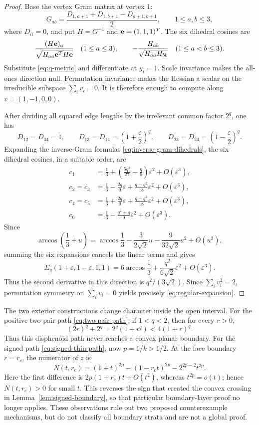 \documentclass[11pt,a4paper]{article}
\theoremstyle{definition}
\theoremstyle{remark}
\begin{document}
\begin{proof}
Base the vertex Gram matrix at vertex $1$:
\[
 G_{ab}=\frac{D_{1,a+1}+D_{1,b+1}-D_{a+1,b+1}}2,
 \qquad1\leq a,b\leq3,
\]
where $D_{ii}=0$, and put $H=G^{-1}$ and ${\bf e}=(1,1,1)^T$.  The six
dihedral cosines are
\begin{equation}\label{eq:inverse-gram-dihedrals}
 \frac{(H{\bf e})_a}{\sqrt{H_{aa}{\bf e}^TH{\bf e}}}
 \quad(1\leq a\leq3),
 \qquad
 -\frac{H_{ab}}{\sqrt{H_{aa}H_{bb}}}
 \quad(1\leq a<b\leq3).
\end{equation}
Substitute \eqref{eq:q-metric} and differentiate at $y_i=1$.  Scale
invariance makes the all-ones direction null.  Permutation invariance makes
the Hessian a scalar on the irreducible subspace $\sum_i v_i=0$.  It is
therefore enough to compute along $v=(1,-1,0,0)$.

After dividing all squared edge lengths by the irrelevant common factor
$2^q$, one has
\[
 D_{12}=D_{34}=1,\qquad
 D_{13}=D_{14}=\left(1+\frac\varepsilon2\right)^q,\qquad
 D_{23}=D_{24}=\left(1-\frac\varepsilon2\right)^q.
\]
Expanding the inverse-Gram formulas \eqref{eq:inverse-gram-dihedrals}, the six
dihedral cosines, in a suitable order, are
\begin{align*}
 c_1&=\frac13+\left(\frac{5q^2}{27}-\frac q9\right)\varepsilon^2
       +O(\varepsilon^3),\\
 c_2=c_3&=\frac13-\frac{2q}{9}\varepsilon
       +\frac{q-q^2}{18}\varepsilon^2+O(\varepsilon^3),\\
 c_4=c_5&=\frac13+\frac{2q}{9}\varepsilon
       +\frac{q-q^2}{18}\varepsilon^2+O(\varepsilon^3),\\
 c_6&=\frac13-\frac{q^2+q}{9}\varepsilon^2+O(\varepsilon^3).
\end{align*}
Since
\[
 \arccos\left(\frac13+u\right)
 =\arccos\frac13-\frac{3}{2\sqrt2}u
  -\frac{9}{32\sqrt2}u^2+O(u^3),
\]
summing the six expansions cancels the linear terms and gives
\[
 \Sigma_q(1+\varepsilon,1-\varepsilon,1,1)
 =6\arccos\frac13+\frac{q^2}{6\sqrt2}\varepsilon^2
 +O(\varepsilon^3).
\]
Thus the second derivative in this direction is $q^2/(3\sqrt2)$.  Since
$\sum_i v_i^2=2$, permutation symmetry on $\sum_i v_i=0$ yields precisely
\eqref{eq:regular-expansion}.
\end{proof}

The two exterior constructions change character inside the open interval.
For the positive two-pair path \eqref{eq:two-pair-path}, if $1<q<2$, then
for every $r>0$,
\begin{equation}\label{eq:middle-two-pair-positive}
 (2r)^q+2^q=2^q(1+r^q)<4(1+r)^q.
\end{equation}
Thus this disphenoid path never reaches a convex planar boundary.  For the
signed path \eqref{eq:signed-thin-path}, now $p=1/k>1/2$.  At the face
boundary $r=r_c$, the numerator of $z$ is
\[
 N(t,r_c)=(1+t)^{2p}-(1-r_ct)^{2p}-2^{2p-2}t^{2p}.
\]
Here the first difference is $2p(1+r_c)t+O(t^2)$, whereas
$t^{2p}=o(t)$; hence $N(t,r_c)>0$ for small $t$.  This reverses the sign that
created the convex crossing in Lemma~\ref{lem:signed-boundary}, so that
particular boundary-layer proof no longer applies.  These observations rule
out two proposed counterexample mechanisms, but do not classify all boundary
strata and are not a global proof.
\end{document}
